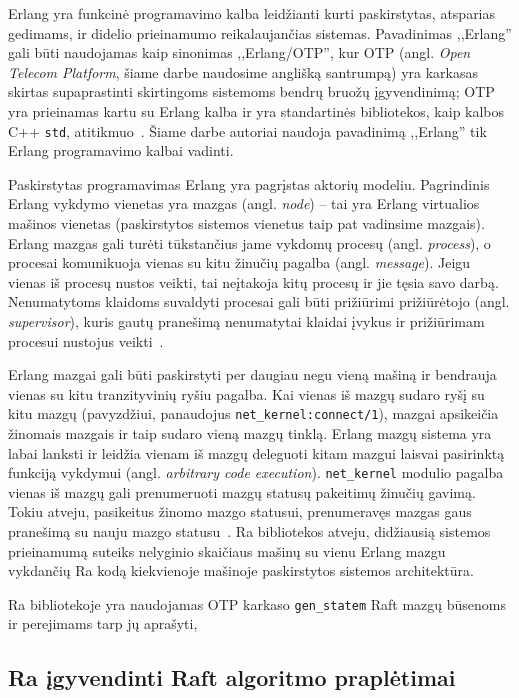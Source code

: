 \documentclass{VUMIFPSkursinis}
\begin{document}
Erlang yra funkcinė programavimo kalba leidžianti kurti paskirstytas, atsparias gedimams, ir didelio prieinamumo reikalaujančias sistemas. Pavadinimas ,,Erlang'' gali būti naudojamas kaip sinonimas ,,Erlang/OTP'', kur OTP (angl. \textit{Open Telecom Platform}, šiame darbe naudosime anglišką santrumpą) yra karkasas skirtas supaprastinti skirtingoms sistemoms bendrų bruožų įgyvendinimą; OTP yra prieinamas kartu su Erlang kalba ir yra standartinės bibliotekos, kaip kalbos C++ \texttt{std}, atitikmuo~\cite{erlang_introduction}. Šiame darbe autoriai naudoja pavadinimą ,,Erlang'' tik Erlang programavimo kalbai vadinti.

Paskirstytas programavimas Erlang yra pagrįstas aktorių modeliu\cite{farrugia_towards_nodate, agha_actors_1985}. Pagrindinis Erlang vykdymo vienetas yra mazgas (angl. \textit{node}) -- tai yra Erlang virtualios mašinos vienetas (paskirstytos sistemos vienetus taip pat vadinsime mazgais). Erlang mazgas gali turėti tūkstančius jame vykdomų procesų (angl. \textit{process}), o procesai komunikuoja vienas su kitu žinučių pagalba (angl. \textit{message}). Jeigu vienas iš procesų nustos veikti, tai neįtakoja kitų procesų ir jie tęsia savo darbą. Nenumatytoms klaidoms suvaldyti procesai gali būti prižiūrimi prižiūrėtojo (angl. \textit{supervisor}), kuris gautų pranešimą nenumatytai klaidai įvykus ir prižiūrimam procesui nustojus veikti~\cite{erlang_distributed}.

Erlang mazgai gali būti paskirstyti per daugiau negu vieną mašiną ir bendrauja vienas su kitu tranzityvinių ryšiu pagalba. Kai vienas iš mazgų sudaro ryšį su kitu mazgų (pavyzdžiui, panaudojus \texttt{net\_kernel:connect/1}), mazgai apsikeičia žinomais mazgais ir taip sudaro vieną mazgų tinklą. Erlang mazgų sistema yra labai lanksti ir leidžia vienam iš mazgų deleguoti kitam mazgui laisvai pasirinktą funkciją vykdymui (angl. \textit{arbitrary code execution}). \texttt{net\_kernel} modulio pagalba vienas iš mazgų gali prenumeruoti mazgų statusų pakeitimų žinučių gavimą. Tokiu atveju, pasikeitus žinomo mazgo statusui, prenumeravęs mazgas gaus pranešimą su nauju mazgo statusu~\cite{erlang_distributed, hebert_learn_2013}. Ra bibliotekos atveju, didžiausią sistemos prieinamumą suteiks nelyginio skaičiaus mašinų su vienu Erlang mazgu vykdančių Ra kodą kiekvienoje mašinoje paskirstytos sistemos architektūra.

Ra bibliotekoje yra naudojamas OTP karkaso \texttt{gen\_statem} Raft mazgų būsenoms ir perejimams tarp jų aprašyti,

\subsection{Ra įgyvendinti Raft algoritmo praplėtimai}
\end{document}
